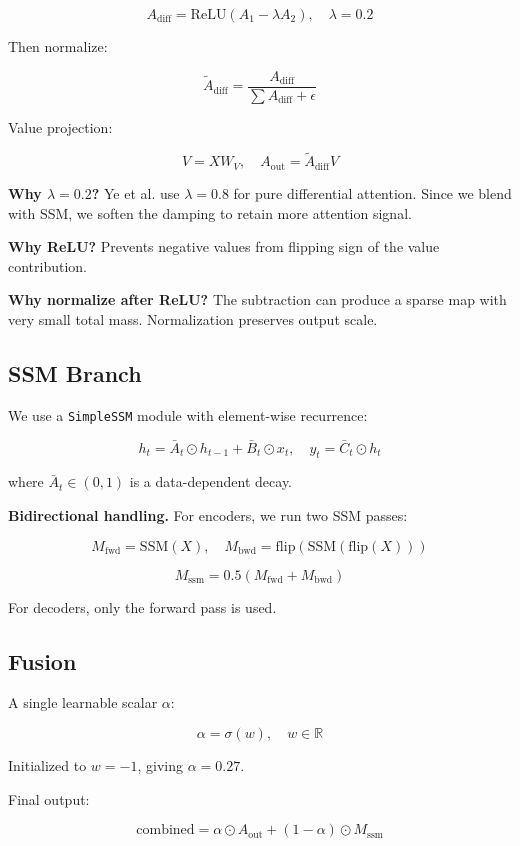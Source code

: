 \[
A_\text{diff} = \text{ReLU}(A_1 - \lambda A_2), \quad \lambda = 0.2
\tag{4.4}
\]

Then normalize:

\[
\tilde{A}_\text{diff} = \frac{A_\text{diff}}{\sum A_\text{diff} + \epsilon}
\tag{4.5}
\]

Value projection:

\[
V = X W_V, \quad A_\text{out} = \tilde{A}_\text{diff} V
\tag{4.6}
\]

\textbf{Why $\lambda = 0.2$?} Ye et al. use $\lambda = 0.8$ for pure differential 
attention. Since we blend with SSM, we soften the damping to retain more 
attention signal.

\textbf{Why ReLU?} Prevents negative values from flipping sign of the value 
contribution.

\textbf{Why normalize after ReLU?} The subtraction can produce a sparse map with 
very small total mass. Normalization preserves output scale.

\subsection{SSM Branch}

We use a \texttt{SimpleSSM} module with element-wise recurrence:

\[
h_t = \bar{A}_t \odot h_{t-1} + \bar{B}_t \odot x_t, \quad
y_t = \bar{C}_t \odot h_t
\tag{4.7}
\]

where $\bar{A}_t \in (0, 1)$ is a data-dependent decay.

\textbf{Bidirectional handling.} For encoders, we run two SSM passes:

\[
M_\text{fwd} = \text{SSM}(X), \quad
M_\text{bwd} = \text{flip}(\text{SSM}(\text{flip}(X)))
\tag{4.8}
\]

\[
M_\text{ssm} = 0.5 (M_\text{fwd} + M_\text{bwd})
\tag{4.9}
\]

For decoders, only the forward pass is used.

\subsection{Fusion}

A single learnable scalar $\alpha$:

\[
\alpha = \sigma(w), \quad w \in \mathbb{R}
\tag{4.10}
\]

Initialized to $w = -1$, giving $\alpha = 0.27$.

Final output:

\[
\text{combined} = \alpha \odot A_\text{out} + (1 - \alpha) \odot M_\text{ssm}
\tag{4.11}
\]

